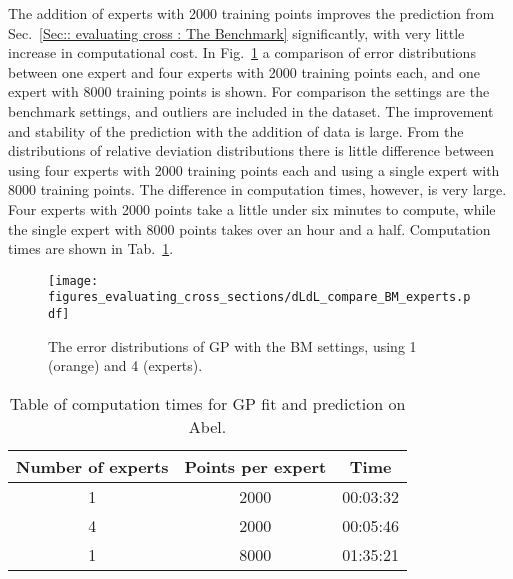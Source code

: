 \documentclass[twoside,english]{uiofysmaster}
\begin{document}
The addition of experts with 2000 training points improves the prediction from Sec.~\ref{Sec:: evaluating cross : The Benchmark} significantly, with very little increase in computational cost. In Fig.~\ref{Fig:: evaluating cross : compare 1 vs 4 expert dLdL} a comparison of error distributions between one expert and four experts with 2000 training points each, and one expert with 8000 training points is shown.  For comparison the settings are the benchmark settings, and outliers are included in the dataset. The improvement and stability of the prediction with the addition of data is large. From the distributions of relative deviation distributions there is little difference between using four experts with 2000 training points each and using a single expert with 8000 training points. The difference in computation times, however, is very large. Four experts with 2000 points take a little under six minutes to compute, while the single expert with 8000 points takes over an hour and a half. Computation times are shown in Tab.~\ref{Tab:: evaluating cross : computation times experts BM}.

\begin{figure}
\centering
\texttt{[image: figures\_evaluating\_cross\_sections/dLdL\_compare\_BM\_experts.pdf]}
\caption{The error distributions of GP with the BM settings, using 1 (orange) and 4 (experts).}
\label{Fig:: evaluating cross : compare 1 vs 4 expert dLdL}
\end{figure}  

\begin{table}
\centering
\begin{tabular}{@{}ccc@{}} \toprule
Number of experts & Points per expert & Time\\
\midrule
1 & 2000 & 00:03:32\\
4 & 2000 & 00:05:46\\
1 & 8000 & 01:35:21\\ \bottomrule
\end{tabular}
\caption{Table of computation times for GP fit and prediction on Abel.}
\label{Tab:: evaluating cross : computation times experts BM}
\end{table}

\end{document}
